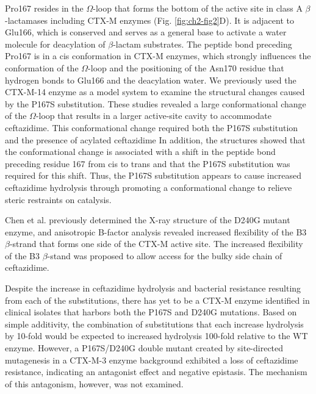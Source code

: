 \documentclass[../main.tex]{subfiles}
\begin{document}
        Pro167 resides in the $\Omega$-loop that forms the bottom of the active site in class A $\beta$-lactamases including CTX-M enzymes\cite{chen_atomic_2005,strynadka_molecular_1992} (Fig. \ref{fig:ch2-fig2}D). It is adjacent to Glu166, which is conserved and serves as a general base to activate a water molecule for deacylation of $\beta$-lactam substrates\cite{strynadka_molecular_1992}. The peptide bond preceding Pro167 is in a cis conformation in CTX-M enzymes, which strongly influences the conformation of the $\Omega$-loop and the positioning of the Asn170 residue that hydrogen bonds to Glu166 and the deacylation water. We previously used the CTX-M-14 enzyme as a model system to examine the structural changes caused by the P167S substitution\cite{patel_drug-resistant_2017}. These studies revealed a large conformational change of the $\Omega$-loop that results in a larger active-site cavity to accommodate ceftazidime. This conformational change required both the P167S substitution and the presence of acylated ceftazidime\cite{patel_drug-resistant_2017} In addition, the structures showed that the conformational change is associated with a shift in the peptide bond preceding residue 167 from cis to trans and that the P167S substitution was required for this shift. Thus, the P167S substitution appears to cause increased ceftazidime hydrolysis through promoting a conformational change to relieve steric restraints on catalysis.

        Chen et al.\cite{chen_atomic_2005} previously determined the X-ray structure of the D240G mutant enzyme, and anisotropic B-factor analysis revealed increased flexibility of the B3 $\beta$-strand that forms one side of the CTX-M active site. The increased flexibility of the B3 $\beta$-stand was proposed to allow access for the bulky side chain of ceftazidime.

        Despite the increase in ceftazidime hydrolysis and bacterial resistance resulting from each of the substitutions, there has yet to be a CTX-M enzyme identified in clinical isolates that harbors both the P167S and D240G mutations. Based on simple additivity, the combination of substitutions that each increase hydrolysis by 10-fold would be expected to increased hydrolysis 100-fold relative to the WT enzyme\cite{wells_additivity_1990}. However, a P167S/D240G double mutant created by site-directed mutagenesis in a CTX-M-3 enzyme background exhibited a loss of ceftazidime resistance, indicating an antagonist effect and negative epistasis\cite{novais_mutational_2008}. The mechanism of this antagonism, however, was not examined.
\end{document}
